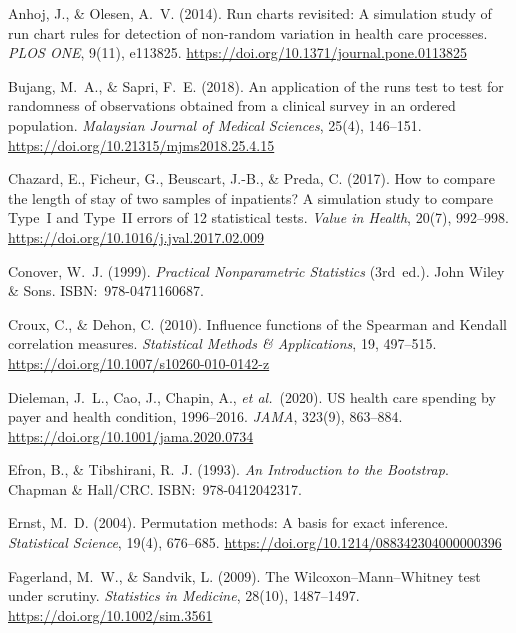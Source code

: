 \documentclass[12pt]{article}
\begin{document}
\begin{enumerate}[label={[\arabic*]}, leftmargin=*, nosep]

\item Anhoj, J., \& Olesen, A.~V. (2014). Run charts revisited:
  A simulation study of run chart rules for detection of non-random
  variation in health care processes. \textit{PLOS ONE}, 9(11),
  e113825. \url{https://doi.org/10.1371/journal.pone.0113825}

\item Bujang, M.~A., \& Sapri, F.~E. (2018). An application of the
  runs test to test for randomness of observations obtained from a
  clinical survey in an ordered population. \textit{Malaysian Journal
  of Medical Sciences}, 25(4), 146--151.
  \url{https://doi.org/10.21315/mjms2018.25.4.15}

\item Chazard, E., Ficheur, G., Beuscart, J.-B., \& Preda, C. (2017).
  How to compare the length of stay of two samples of inpatients?
  A simulation study to compare Type~I and Type~II errors of 12
  statistical tests. \textit{Value in Health}, 20(7), 992--998.
  \url{https://doi.org/10.1016/j.jval.2017.02.009}

\item Conover, W.~J. (1999). \textit{Practical Nonparametric
  Statistics} (3rd~ed.). John Wiley \& Sons. ISBN:~978-0471160687.

\item Croux, C., \& Dehon, C. (2010). Influence functions of the
  Spearman and Kendall correlation measures. \textit{Statistical
  Methods \& Applications}, 19, 497--515.
  \url{https://doi.org/10.1007/s10260-010-0142-z}

\item Dieleman, J.~L., Cao, J., Chapin, A., \emph{et al.}\ (2020).
  US health care spending by payer and health condition,
  1996--2016. \textit{JAMA}, 323(9), 863--884.
  \url{https://doi.org/10.1001/jama.2020.0734}

\item Efron, B., \& Tibshirani, R.~J. (1993). \textit{An Introduction
  to the Bootstrap}. Chapman \& Hall/CRC. ISBN:~978-0412042317.

\item Ernst, M.~D. (2004). Permutation methods: A basis for exact
  inference. \textit{Statistical Science}, 19(4), 676--685.
  \url{https://doi.org/10.1214/088342304000000396}

\item Fagerland, M.~W., \& Sandvik, L. (2009). The
  Wilcoxon--Mann--Whitney test under scrutiny. \textit{Statistics in
  Medicine}, 28(10), 1487--1497.
  \url{https://doi.org/10.1002/sim.3561}


\end{enumerate}
\end{document}
